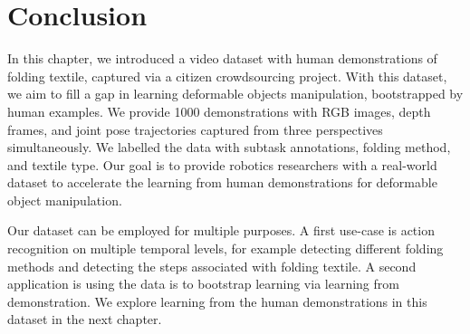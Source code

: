\documentclass[\home/main.tex]{subfiles}
\begin{document}
\section{Conclusion}

In this chapter, we introduced a video dataset with human demonstrations of folding textile, captured via a citizen crowdsourcing project. With this dataset, we aim to fill a gap in learning deformable objects manipulation, bootstrapped by human examples. We provide \qty{1000}{} demonstrations with RGB images, depth frames, and joint pose trajectories captured from three perspectives simultaneously. We labelled the data with subtask annotations, folding method, and textile type. Our goal is to provide robotics researchers with a real-world dataset to accelerate the learning from human demonstrations for deformable object manipulation.

Our dataset can be employed for multiple purposes. A first use-case is action recognition on multiple temporal levels, for example detecting different folding methods and detecting the steps associated with folding textile. A second application is using the data is to bootstrap learning via learning from demonstration. We explore learning from the human demonstrations in this dataset in the next chapter. 
\end{document}
